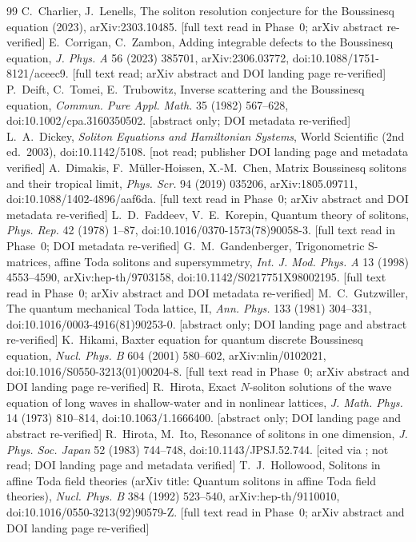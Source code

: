 \documentclass[11pt,a4paper]{article}
\theoremstyle{remark}
\begin{document}
\begin{thebibliography}{99}
 C.~Charlier, J.~Lenells, The soliton resolution conjecture for the Boussinesq equation (2023), arXiv:2303.10485. [full text read in Phase~0; arXiv abstract re-verified]
 E.~Corrigan, C.~Zambon, Adding integrable defects to the Boussinesq equation, \emph{J. Phys. A} 56 (2023) 385701, arXiv:2306.03772, doi:10.1088/1751-8121/aceec9. [full text read; arXiv abstract and DOI landing page re-verified]
 P.~Deift, C.~Tomei, E.~Trubowitz, Inverse scattering and the Boussinesq equation, \emph{Commun. Pure Appl. Math.} 35 (1982) 567--628, doi:10.1002/cpa.3160350502. [abstract only; DOI metadata re-verified]
 L.~A.~Dickey, \emph{Soliton Equations and Hamiltonian Systems}, World Scientific (2nd ed.\ 2003), doi:10.1142/5108. [not read; publisher DOI landing page and metadata verified]
 A.~Dimakis, F.~M\"uller-Hoissen, X.-M.~Chen, Matrix Boussinesq solitons and their tropical limit, \emph{Phys. Scr.} 94 (2019) 035206, arXiv:1805.09711, doi:10.1088/1402-4896/aaf6da. [full text read in Phase~0; arXiv abstract and DOI metadata re-verified]
 L.~D.~Faddeev, V.~E.~Korepin, Quantum theory of solitons, \emph{Phys. Rep.} 42 (1978) 1--87, doi:10.1016/0370-1573(78)90058-3. [full text read in Phase~0; DOI metadata re-verified]
 G.~M.~Gandenberger, Trigonometric S-matrices, affine Toda solitons and supersymmetry, \emph{Int. J. Mod. Phys. A} 13 (1998) 4553--4590, arXiv:hep-th/9703158, doi:10.1142/S0217751X98002195. [full text read in Phase~0; arXiv abstract and DOI metadata re-verified]
 M.~C.~Gutzwiller, The quantum mechanical Toda lattice, II, \emph{Ann. Phys.} 133 (1981) 304--331, doi:10.1016/0003-4916(81)90253-0. [abstract only; DOI landing page and abstract re-verified]
 K.~Hikami, Baxter equation for quantum discrete Boussinesq equation, \emph{Nucl. Phys. B} 604 (2001) 580--602, arXiv:nlin/0102021, doi:10.1016/S0550-3213(01)00204-8. [full text read in Phase~0; arXiv abstract and DOI landing page re-verified]
 R.~Hirota, Exact $N$-soliton solutions of the wave equation of long waves in shallow-water and in nonlinear lattices, \emph{J. Math. Phys.} 14 (1973) 810--814, doi:10.1063/1.1666400. [abstract only; DOI landing page and abstract re-verified]
 R.~Hirota, M.~Ito, Resonance of solitons in one dimension, \emph{J. Phys. Soc. Japan} 52 (1983) 744--748, doi:10.1143/JPSJ.52.744. [cited via \cite{DMHC}; not read; DOI landing page and metadata verified]
 T.~J.~Hollowood, Solitons in affine Toda field theories (arXiv title: Quantum solitons in affine Toda field theories), \emph{Nucl. Phys. B} 384 (1992) 523--540, arXiv:hep-th/9110010, doi:10.1016/0550-3213(92)90579-Z. [full text read in Phase~0; arXiv abstract and DOI landing page re-verified]

\end{thebibliography}
\end{document}
